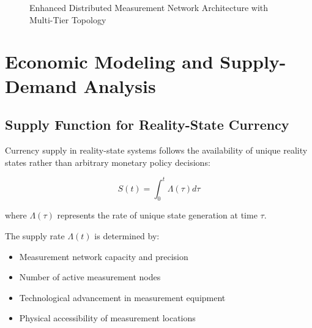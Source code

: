 \documentclass[12pt,a4paper]{article}
\begin{document}
\begin{figure}[H]
\caption{Enhanced Distributed Measurement Network Architecture with Multi-Tier Topology}
\label{fig:distributed_network_architecture}
\end{figure}

\section{Economic Modeling and Supply-Demand Analysis}

\subsection{Supply Function for Reality-State Currency}

Currency supply in reality-state systems follows the availability of unique reality states rather than arbitrary monetary policy decisions:

\begin{equation}
S(t) = \int_0^t \Lambda(\tau) d\tau
\end{equation}

where $\Lambda(\tau)$ represents the rate of unique state generation at time $\tau$.

The supply rate $\Lambda(t)$ is determined by:
\begin{itemize}
\item Measurement network capacity and precision
\item Number of active measurement nodes
\item Technological advancement in measurement equipment
\item Physical accessibility of measurement locations
\end{itemize}
\end{document}
